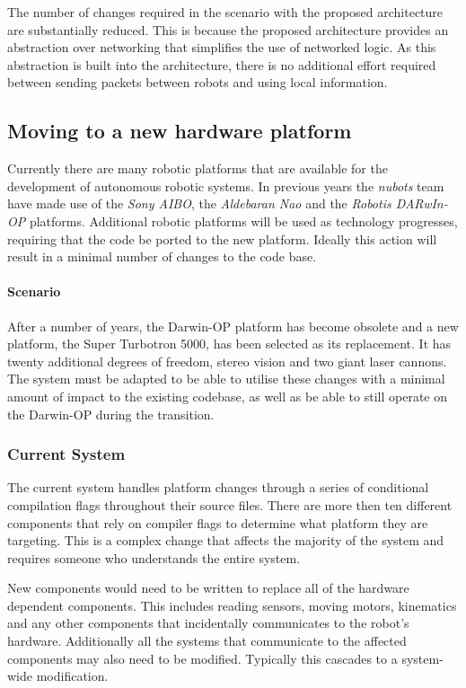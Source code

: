 \documentclass[english,12pt]{scrartcl}
\begin{document}
				The number of changes required in the scenario with the proposed architecture are substantially reduced.
				This is because the proposed architecture provides an abstraction over networking that simplifies the use of networked logic.
				As this abstraction is built into the architecture, there is no additional effort required between sending packets between robots and using local information.
				
		\subsection{Moving to a new hardware platform}
			Currently there are many robotic platforms that are available for the development of autonomous
			robotic systems. In previous years the \emph{\gls{nubots}} team have made use of the \emph{Sony AIBO},
			the \emph{Aldebaran Nao} and the \emph{Robotis DARwIn-OP} platforms. Additional robotic platforms will be used as technology progresses, requiring that the code be ported to the new platform.
			Ideally this action will result in a minimal number of changes to the code base.

			\paragraph{Scenario} After a number of years, the Darwin-OP platform has become obsolete and a new platform, the Super Turbotron 5000, has been selected as its replacement. It has twenty
			additional degrees of freedom, stereo vision and two giant laser cannons. The system must be
			adapted to be able to utilise these changes with a minimal amount of impact to the existing codebase, as well as be able to still operate on the Darwin-OP during the transition.

			\subsubsection{Current System}
				The current system handles platform changes through a series of conditional compilation flags throughout their source files.
				There are more then ten different components that rely on compiler flags to determine what platform they are targeting.
				This is a complex change that affects the majority of the system and requires someone who understands the entire system.
				
				New components would need to be written to replace all of the hardware dependent components. This includes reading sensors, moving motors, kinematics and any other components that incidentally communicates to the robot's hardware.
				Additionally all the systems that communicate to the affected components may also need to be modified.
				Typically this cascades to a system-wide modification.
\end{document}
